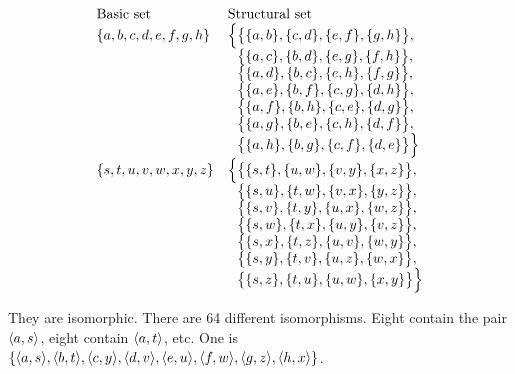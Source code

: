 \begin{exercise}
\[
\begin{array}{ll}
    \text{Basic set} & \text{Structural set}\\
    \set{a,b,c,d,e,f,g,h} & \Bigl\{ \bigl\{ \set{a,b}, \set{c,d}, \set{e,f}, \set{g,h} \bigr\},\\
               & \hphantom{\Bigl\{} \bigl\{ \set{a,c}, \set{b,d}, \set{e,g}, \set{f,h} \bigr\},\\
               & \hphantom{\Bigl\{} \bigl\{ \set{a,d}, \set{b,c}, \set{e,h}, \set{f,g} \bigr\},\\
               & \hphantom{\Bigl\{} \bigl\{ \set{a,e}, \set{b,f}, \set{c,g}, \set{d,h} \bigr\},\\
               & \hphantom{\Bigl\{} \bigl\{ \set{a,f}, \set{b,h}, \set{c,e}, \set{d,g} \bigr\},\\
               & \hphantom{\Bigl\{} \bigl\{ \set{a,g}, \set{b,e}, \set{c,h}, \set{d,f} \bigr\},\\
               & \hphantom{\Bigl\{} \bigl\{ \set{a,h}, \set{b,g}, \set{c,f}, \set{d,e} \bigr\} \Bigr\}\\
    \set{s,t,u,v,w,x,y,z} & \Bigl\{ \bigl\{ \set{s,t}, \set{u,w}, \set{v,y}, \set{x,z} \bigr\},\\
               & \hphantom{\Bigl\{} \bigl\{ \set{s,u}, \set{t,w}, \set{v,x}, \set{y,z} \bigr\},\\
               & \hphantom{\Bigl\{} \bigl\{ \set{s,v}, \set{t,y}, \set{u,x}, \set{w,z} \bigr\},\\
               & \hphantom{\Bigl\{} \bigl\{ \set{s,w}, \set{t,x}, \set{u,y}, \set{v,z} \bigr\},\\
               & \hphantom{\Bigl\{} \bigl\{ \set{s,x}, \set{t,z}, \set{u,v}, \set{w,y} \bigr\},\\
               & \hphantom{\Bigl\{} \bigl\{ \set{s,y}, \set{t,v}, \set{u,z}, \set{w,x} \bigr\},\\
               & \hphantom{\Bigl\{} \bigl\{ \set{s,z}, \set{t,u}, \set{u,w}, \set{x,y} \bigr\} \Bigr\}\\
\end{array}
\]
\end{exercise}

\begin{solution}
They are isomorphic. There are 64 different isomorphisms. Eight contain the pair
$\left\langle a, s\right\rangle$, eight contain $\left\langle a, t\right\rangle$, etc.
One is $\set{\aprn{a,s},\aprn{b,t},\aprn{c,y},\aprn{d,v},\aprn{e,u},\aprn{f,w},\aprn{g,z},\aprn{h,x}}$.
\end{solution}

